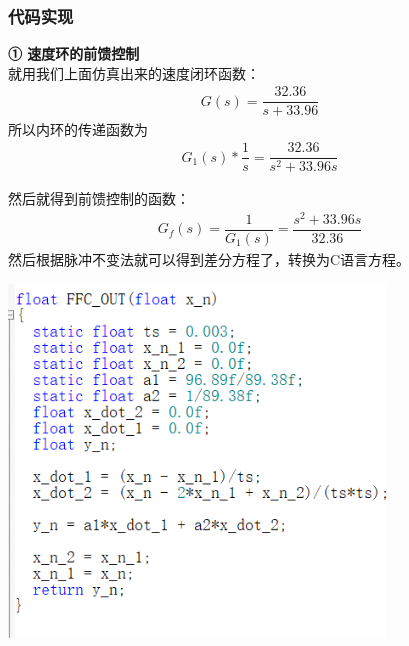 \documentclass[UTF8,a4paper,12pt]{ctexart}
\begin{document}
      \subsubsection{代码实现}
       \textbf{① 速度环的前馈控制}\\
        就用我们上面仿真出来的速度闭环函数：
        \begin{align*}
          G(s)=\dfrac{32.36}{s+33.96}
        \end{align*}
        所以内环的传递函数为
        \begin{align*}
          G_1(s)*\dfrac{1}{s}=\dfrac{32.36}{s^2+33.96s}
        \end{align*}
        
        然后就得到前馈控制的函数： 
        \begin{align*}
           G_f(s)=\dfrac{1}{G_1(s)}=\dfrac{s^2+33.96s}{32.36}
        \end{align*}
        然后根据脉冲不变法就可以得到差分方程了，转换为C语言方程。\\
        \par \includegraphics[width=10cm]{picture/FFC_function.png} \\
\end{document}
